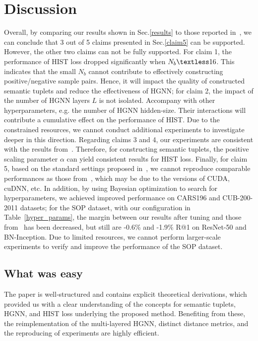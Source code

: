 \section{Discussion\label{discussion}}
Overall, by comparing our results shown in Sec.\ref{results} to those reported in~\cite{lim2022hypergraph}, we can conclude that 3 out of 5 claims presented in Sec.\ref{claim5} can be supported. However, the other two claims can not be fully supported. For claim 1, the performance of HIST loss dropped significantly when $N_b\textless 16$. This indicates that the small $N_b$ cannot contribute to effectively constructing positive/negative sample pairs. Hence, it will impact the quality of constructed semantic tuplets and reduce the effectiveness of HGNN; for claim 2, the impact of the number of HGNN layers $L$ is not isolated. Accompany with other hyperparameters, e.g. the number of HGNN hidden-size. Their interactions will contribute a cumulative effect on the performance of HIST. Due to the constrained resources, we cannot conduct additional experiments to investigate deeper in this direction. Regarding claims 3 and 4, our experiments are consistent with the results from~\cite{lim2022hypergraph}. Therefore, for constructing semantic tuplets, the positive scaling parameter $\alpha$ can yield consistent results for HIST loss. Finally, for claim 5, based on the standard settings proposed in~\cite{lim2022hypergraph}, we cannot reproduce comparable performances as those from~\cite{lim2022hypergraph}, which may be due to the versions of CUDA, cuDNN, etc. In addition, by using Bayesian optimization to search for hyperparameters, we achieved improved performance on CARS196 and CUB-200-2011 datasets; for the SOP dataset, with our configuration in Table~\ref{hyper_params}, the margin between our results after tuning and those from~\cite{lim2022hypergraph} has been decreased, but still are -0.6\% and -1.9\% R@1 on ResNet-50 and BN-Inception. Due to limited resources, we cannot perform larger-scale experiments to verify and improve the performance of the SOP dataset.

\subsection{What was easy}
The paper\cite{lim2022hypergraph} is well‐structured and contains explicit theoretical derivations, which provided us with a clear understanding of the concepts for semantic tuplets, HGNN, and HIST loss underlying the proposed method. Benefiting from these, the reimplementation of the multi-layered HGNN, distinct distance metrics, and the reproducing of experiments are highly efficient.

